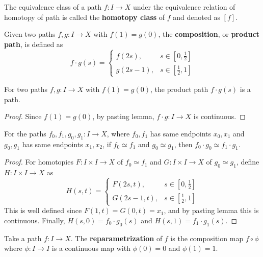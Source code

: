 \begin{defn} The equivalence class of a path $f:I\rightarrow X$ under the equivalence relation of homotopy of path is called the \textbf{homotopy class} of $f$ and denoted as $[f]$.
\end{defn}

\begin{defn} Given two paths $f,g:I\rightarrow X$ with $f(1)=g(0)$, the \textbf{composition}, or \textbf{product path}, is defined as
\begin{equation}
f\cdot g(s)=\begin{cases}
f(2s),&s\in[0,\frac{1}{2}]\\
g(2s-1),&s\in[\frac{1}{2},1]
\end{cases}
\end{equation}
\end{defn}
\begin{prop} For two paths $f,g:I\rightarrow X$ with $f(1)=g(0)$, the product path $f\cdot g(s)$ is a path.
\end{prop}
\begin{proof} Since $f(1)=g(0)$, by pasting lemma, $f\cdot g:I\rightarrow X$ is continuous.
\end{proof}

\begin{lemma} For the paths $f_0,f_1,g_0,g_1:I\rightarrow X$, where $f_0,f_1$ has same endpoints $x_0,x_1$ and $g_0,g_1$ has same endpoints $x_1,x_2$, if $f_0\simeq f_1$ and $g_0\simeq g_1$, then $f_0\cdot g_0\simeq f_1\cdot g_1$.
\end{lemma}
\begin{proof} For homotopies $F:I\times I\rightarrow X$ of $f_0\simeq f_1$ and $G:I\times I\rightarrow X$ of $g_0\simeq g_1$, define $H:I\times I\rightarrow X$ as
\begin{equation}
H(s,t)=\begin{cases} F(2s,t),&s\in [0,\frac{1}{2}]\\
G(2s-1,t),&s\in [\frac{1}{2},1]
\end{cases}
\end{equation}
This is well defined since $F(1,t)=G(0,t)=x_1$, and by pasting lemma this is continuous. Finally, $H(s,0)=f_0\cdot g_0(s)$ and $H(s,1)=f_1\cdot g_1(s)$.
\end{proof}

\begin{defn} Take a path $f:I\rightarrow X$. The \textbf{reparametrization} of $f$ is the composition map $f\circ \phi$ where $\phi:I\rightarrow I$ is a continuous map with $\phi(0)=0$ and $\phi(1)=1$.
\end{defn}

